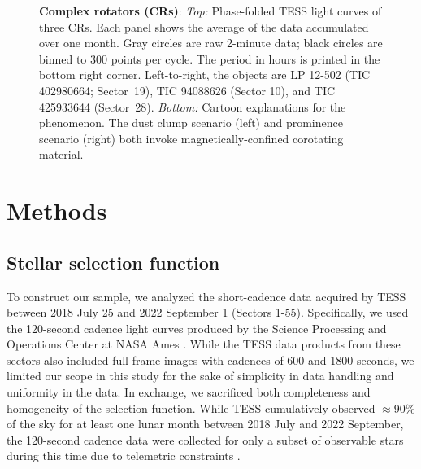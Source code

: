 \documentclass[11pt,twocolumn,tighten]{aastex63}
\begin{document}
\begin{figure*}[!t]
	\begin{center}
		
		\vspace{-0.6cm}
	\end{center}
		\vspace{-0.3cm}
	\caption{
		{\bf Complex rotators (CRs)}:
    {\it Top:} Phase-folded TESS light curves of three CRs.  Each panel shows
    the average of the data accumulated over one month.
    Gray circles are raw 2-minute data; black
    circles are binned to 300 points per cycle.  The period in hours
    is printed in the
    bottom right corner.  Left-to-right, the objects are LP
    12-502 (TIC 402980664; Sector~19), TIC 94088626 (Sector 10), and
    TIC 425933644 (Sector~28).
    {\it Bottom:} Cartoon explanations for the phenomenon.  The dust
    clump scenario (left) and prominence scenario (right) both invoke
    magnetically-confined corotating material.
	}
	\label{fig:f1}
\end{figure*}



\section{Methods}
\label{sec:methods}

\subsection{Stellar selection function}
\label{subsec:selectionfn}

To construct our sample, we analyzed the short-cadence data acquired
by TESS between 2018 July 25 and 2022 September 1 (Sectors 1-55).
Specifically, we used the 120-second cadence light curves produced by
the Science Processing and Operations Center at NASA Ames
\citep{2016SPIE.9913E..3EJ}.  While the TESS data products from these
sectors also included full frame images with cadences of 600 and 1800
seconds, we limited our scope in this study for the sake of simplicity
in data handling and uniformity in the data.  In exchange, we
sacrificed both completeness and homogeneity of the selection
function.  While TESS cumulatively observed $\approx$90\% of the sky
for at least one lunar month between 2018 July and 2022 September, the
120-second cadence data were collected for only a subset of observable
stars during this time due to telemetric constraints
\citep[see][]{2021PASP..133i5002F}.
\end{document}
